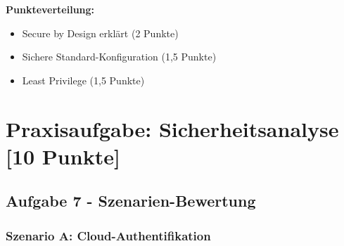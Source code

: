 \documentclass[12pt,a4paper]{article}
\begin{document}
\textbf{Punkteverteilung:}
\begin{itemize}
    \item Secure by Design erklärt (2 Punkte) \checkmark
    \item Sichere Standard-Konfiguration (1,5 Punkte) \checkmark
    \item Least Privilege (1,5 Punkte) \checkmark
\end{itemize}


\newpage

\section{Praxisaufgabe: Sicherheitsanalyse [10 Punkte]}

\subsection{Aufgabe 7 - Szenarien-Bewertung}

\subsubsection*{Szenario A: Cloud-Authentifikation}
\end{document}
